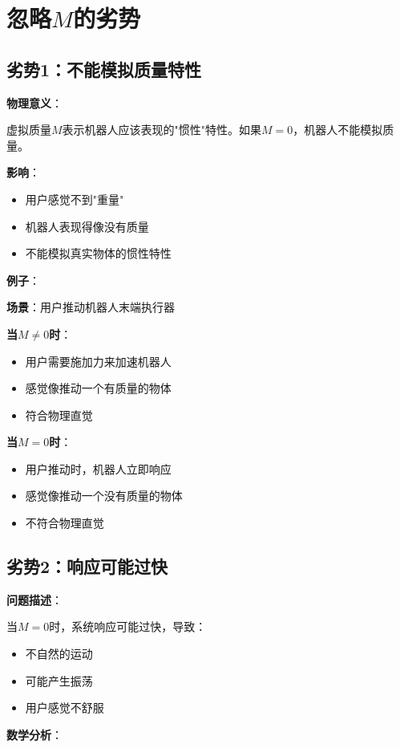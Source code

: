 \documentclass[12pt,a4paper]{article}
\begin{document}
\section{忽略$M$的劣势}

\subsection{劣势1：不能模拟质量特性}

\textbf{物理意义}：

虚拟质量$M$表示机器人应该表现的"惯性"特性。如果$M = 0$，机器人不能模拟质量。

\textbf{影响}：
\begin{itemize}
\item 用户感觉不到"重量"
\item 机器人表现得像没有质量
\item 不能模拟真实物体的惯性特性
\end{itemize}

\textbf{例子}：

\textbf{场景}：用户推动机器人末端执行器

\textbf{当$M \neq 0$时}：
\begin{itemize}
\item 用户需要施加力来加速机器人
\item 感觉像推动一个有质量的物体
\item 符合物理直觉
\end{itemize}

\textbf{当$M = 0$时}：
\begin{itemize}
\item 用户推动时，机器人立即响应
\item 感觉像推动一个没有质量的物体
\item 不符合物理直觉
\end{itemize}

\subsection{劣势2：响应可能过快}

\textbf{问题描述}：

当$M = 0$时，系统响应可能过快，导致：
\begin{itemize}
\item 不自然的运动
\item 可能产生振荡
\item 用户感觉不舒服
\end{itemize}

\textbf{数学分析}：
\end{document}
